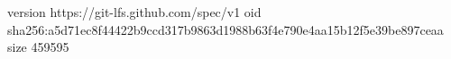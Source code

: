 version https://git-lfs.github.com/spec/v1
oid sha256:a5d71ec8f44422b9ccd317b9863d1988b63f4e790e4aa15b12f5e39be897ceaa
size 459595
